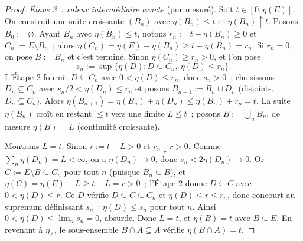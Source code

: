 \documentclass[11pt,a4paper]{article}
\theoremstyle{plain}
\theoremstyle{definition}
\begin{document}
\begin{proof}
\emph{Étape 3~: valeur intermédiaire exacte} (pur mesuré). Soit $t\in[0,\eta(E)]$. On construit une suite croissante $(B_n)$ avec $\eta(B_n)\le t$ et $\eta(B_n)\uparrow t$. Posons $B_0:=\varnothing$. Ayant $B_n$ avec $\eta(B_n)\le t$, notons $r_n:=t-\eta(B_n)\ge0$ et $C_n:=E\setminus B_n$~; alors $\eta(C_n)=\eta(E)-\eta(B_n)\ge t-\eta(B_n)=r_n$. Si $r_n=0$, on pose $B:=B_n$ et c'est terminé. Sinon $\eta(C_n)\ge r_n>0$, et l'on pose
\[
s_n:=\sup\{\eta(D):D\subseteq C_n,\ \eta(D)\le r_n\}.
\]
L'Étape 2 fournit $D\subseteq C_n$ avec $0<\eta(D)\le r_n$, donc $s_n>0$~; choisissons $D_n\subseteq C_n$ avec $s_n/2<\eta(D_n)\le r_n$ et posons $B_{n+1}:=B_n\sqcup D_n$ (disjoints, $D_n\subseteq C_n$). Alors $\eta(B_{n+1})=\eta(B_n)+\eta(D_n)\le\eta(B_n)+r_n=t$. La suite $\eta(B_n)$ croît en restant $\le t$ vers une limite $L\le t$~; posons $B:=\bigcup_n B_n$, de mesure $\eta(B)=L$ (continuité croissante).

Montrons $L=t$. Sinon $r:=t-L>0$ et $r_n\downarrow r>0$. Comme $\sum_n\eta(D_n)=L<\infty$, on a $\eta(D_n)\to0$, donc $s_n<2\eta(D_n)\to0$. Or $C:=E\setminus B\subseteq C_n$ pour tout $n$ (puisque $B_n\subseteq B$), et $\eta(C)=\eta(E)-L\ge t-L=r>0$~; l'Étape 2 donne $D\subseteq C$ avec $0<\eta(D)\le r$. Ce $D$ vérifie $D\subseteq C\subseteq C_n$ et $\eta(D)\le r\le r_n$, donc concourt au supremum définissant $s_n$~: $\eta(D)\le s_n$ pour tout $n$. Ainsi $0<\eta(D)\le\lim_n s_n=0$, absurde. Donc $L=t$, et $\eta(B)=t$ avec $B\subseteq E$. En revenant à $\eta_A$, le sous-ensemble $B\cap A\subseteq A$ vérifie $\eta(B\cap A)=t$.
\end{proof}
\end{document}
